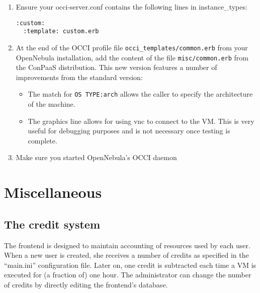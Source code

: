 \documentclass[10pt]{article}
\begin{document}
\begin{enumerate}
\item Ensure your occi-server.conf contains the following lines in instance\_types:
\begin{verbatim}
:custom:
  :template: custom.erb
\end{verbatim}
\item At the end of the OCCI profile file \verb+occi_templates/common.erb+ 
  from your OpenNebula installation, add the content of the file
  \verb+misc/common.erb+ from the ConPaaS distribution. This new version 
  features a number of improvements from the standard version:
  \begin{itemize}
  \item The match for \verb+OS TYPE:arch+ allows the caller to specify
    the architecture of the machine.
  \item The graphics line allows for using vnc to connect to the VM.
    This is very useful for debugging purposes and is not necessary
    once testing is complete.

  \end{itemize}

\item Make sure you started OpenNebula's OCCI daemon

\end{enumerate}

\section{Miscellaneous}
\label{sec:misc}

\subsection{The credit system}

The frontend is designed to maintain accounting of resources used by
each user. When a new user is created, she receives a number of
credits as specified in the ``main.ini'' configuration file. Later on,
one credit is subtracted each time a VM is executed for (a fraction
of) one hour. The administrator can change the number of credits by
directly editing the frontend's database. 
\end{document}
